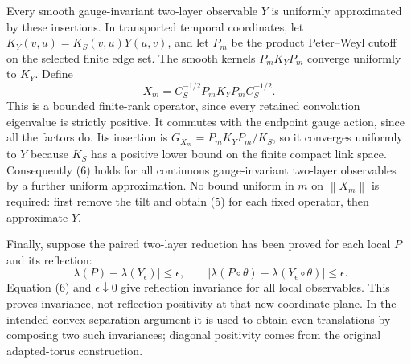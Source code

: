 \documentclass[11pt]{article}
\newcommand{\norm}[1]{\left\|#1\right\|}
\begin{document}
Every smooth gauge-invariant two-layer observable $Y$ is uniformly
approximated by these insertions. In transported temporal coordinates,
let $K_Y(v,u)=K_S(v,u)Y(u,v)$, and let $P_m$ be the product
Peter--Weyl cutoff on the selected finite edge set. The smooth kernels
$P_mK_YP_m$ converge uniformly to $K_Y$. Define
\[
 X_m=C_S^{-1/2}P_mK_YP_mC_S^{-1/2}.
\]
This is a bounded finite-rank operator, since every retained
convolution eigenvalue is strictly positive. It commutes with the
endpoint gauge action, since all the factors do. Its insertion is
$G_{X_m}=P_mK_YP_m/K_S$, so it converges uniformly to $Y$ because
$K_S$ has a positive lower bound on the finite compact link space.
Consequently (6) holds for all continuous gauge-invariant two-layer
observables by a further uniform approximation.
No bound uniform in $m$ on $\norm{X_m}$ is required: first remove
the tilt and obtain (5) for each fixed operator, then approximate $Y$.

Finally, suppose the paired two-layer reduction has been proved for
each local $P$ and its reflection:
\[
 |\lambda(P)-\lambda(Y_\epsilon)|\leq\epsilon,\qquad
 |\lambda(P\circ\theta)-\lambda(Y_\epsilon\circ\theta)|\leq\epsilon.
\]
Equation (6) and $\epsilon\downarrow0$ give reflection invariance for
all local observables. This proves invariance, not reflection
positivity at that new coordinate plane. In the intended convex
separation argument it is used to obtain even translations by composing
two such invariances; diagonal positivity comes from the original
adapted-torus construction.
\end{document}
